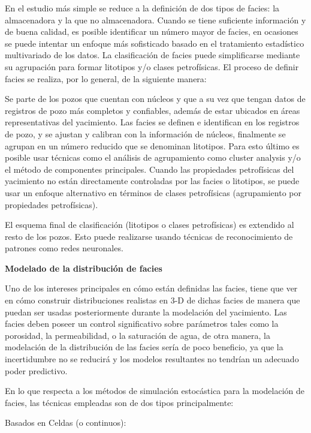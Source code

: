 En el estudio m\'as simple se reduce a la definici\'on de dos tipos de facies: la almacenadora y la que no almacenadora. Cuando se tiene suficiente informaci\'on y de buena calidad, es posible identificar un n\'umero mayor de facies, en ocasiones se puede intentar un enfoque m\'as sofisticado basado en el tratamiento estad\'istico multivariado de los datos. La clasificaci\'on de facies puede simplificarse mediante su agrupaci\'on para formar litotipos y/o clases petrof\'isicas. El proceso de definir facies se realiza, por lo general, de la siguiente manera: 

Se parte de los pozos que cuentan con n\'ucleos y que a su vez que tengan datos de registros de pozo m\'as completos y confiables, adem\'as de estar ubicados en \'areas representativas del yacimiento. 
Las facies se definen e identifican en los registros de pozo, y se ajustan y calibran con la informaci\'on de n\'ucleos, finalmente se agrupan en un n\'umero reducido que se denominan litotipos. Para esto \'ultimo es posible usar t\'ecnicas como el an\'alisis de agrupamiento como cluster analysis y/o el m\'etodo de componentes principales. Cuando las propiedades petrof\'isicas del yacimiento no est\'an directamente controladas por las facies o litotipos, se puede usar un enfoque alternativo en t\'erminos de clases petrof\'isicas (agrupamiento por propiedades petrof\'isicas). 

El esquema final de clasificaci\'on (litotipos o clases petrof\'isicas) es extendido al resto de los pozos. Esto puede realizarse usando t\'ecnicas de reconocimiento de patrones como redes neuronales.

\textbf{Modelado de la distribuci\'on de facies}

Uno de los intereses principales en c\'omo est\'an definidas las facies, tiene que ver en c\'omo construir distribuciones realistas en 3-D de dichas facies de manera que puedan ser usadas posteriormente durante la modelaci\'on del yacimiento.  Las facies deben poseer un control significativo sobre par\'ametros tales como la porosidad, la permeabilidad, o la saturaci\'on de agua, de otra manera, la modelaci\'on de la distribuci\'on de las facies ser\'ia de poco beneficio, ya que la incertidumbre no se reducir\'a y los modelos resultantes no tendr\'ian un adecuado poder predictivo.

En lo que respecta a los m\'etodos de simulaci\'on estoc\'astica para la modelaci\'on de facies, las t\'ecnicas empleadas son de dos tipos principalmente:

Basados en Celdas (o continuos):

